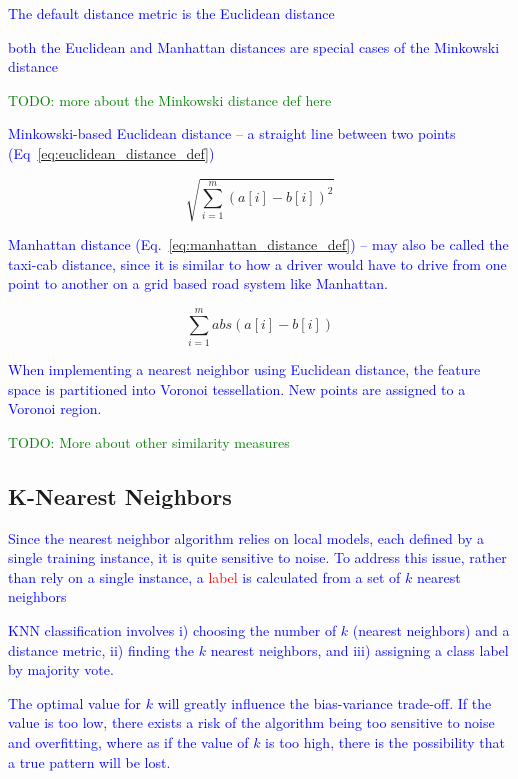 \textcolor{blue}{The default distance metric is the Euclidean distance}

\textcolor{blue}{both the Euclidean and Manhattan distances are special cases of the Minkowski distance}

\textcolor{green}{TODO: more about the Minkowski distance def here}

\textcolor{blue}{Minkowski-based Euclidean distance -- a straight line between two points (Eq~\ref{eq:euclidean_distance_def})}

\begin{equation}
{\sqrt{\sum_{i=1}^{m}{{(a[i] - b[i])}^2}}}
\label{eq:euclidean_distance_def}
\end{equation}

\textcolor{blue}{Manhattan distance (Eq.~\ref{eq:manhattan_distance_def}) -- may also be called the taxi-cab distance, since it is similar to how a driver would have to drive from one point to another on a grid based road system like Manhattan.}

\begin{equation}
{\sum_{i=1}^{m}{abs(a[i] - b[i])}}
\label{eq:manhattan_distance_def}
\end{equation}

\textcolor{blue}{When implementing a nearest neighbor using Euclidean distance, the feature space is partitioned into {Voronoi tessellation}. New points are assigned to a {Voronoi region}.}

\textcolor{green}{TODO: More about other similarity measures}

\subsection{K-Nearest Neighbors}

\textcolor{blue}{Since the nearest neighbor algorithm relies on local models, each defined by a single training instance, it is quite sensitive to noise. To address this issue, rather than rely on a single instance, a \textcolor{red}{label} is calculated from a set of $k$ nearest neighbors}

\textcolor{blue}{KNN classification involves i) choosing the number of $k$ (nearest neighbors) and a distance metric, ii) finding the $k$ nearest neighbors, and iii) assigning a class label by majority vote.}

\textcolor{blue}{The optimal value for $k$ will greatly influence the bias-variance trade-off. If the value is too low, there exists a risk of the algorithm being too sensitive to noise and overfitting, where as if the value of $k$ is too high, there is the possibility that a true pattern will be lost.}

